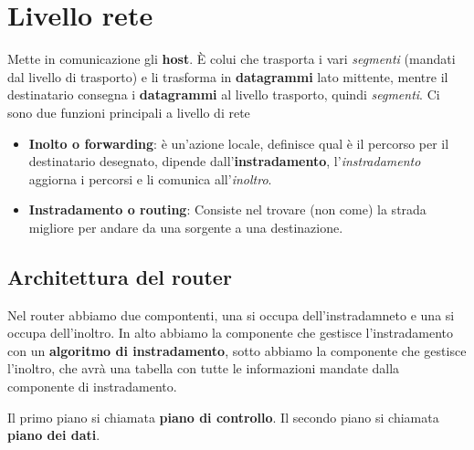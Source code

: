 \section{Livello rete}
Mette in comunicazione gli \textbf{host}. È colui che trasporta i vari \textit{segmenti} (mandati dal livello di trasporto) e li trasforma in \textbf{datagrammi} lato mittente, mentre il destinatario consegna i \textbf{datagrammi} al livello trasporto, quindi \textit{segmenti}.
Ci sono due funzioni principali a livello di rete 
\begin{itemize}
  \item \textbf{Inolto o forwarding}: è un'azione locale, definisce qual è il percorso per il destinatario desegnato, dipende dall'\textbf{instradamento}, l'\textit{instradamento} aggiorna i percorsi e li comunica all'\textit{inoltro}.
  \item \textbf{Instradamento o routing}: Consiste nel trovare (non come) la strada migliore per andare da una sorgente a una destinazione.
\end{itemize}

\subsection{Architettura del router}
Nel router abbiamo due compontenti, una si occupa dell'instradamneto e una si occupa dell'inoltro. 
In alto abbiamo la componente che gestisce l'instradamento con un \textbf{algoritmo di instradamento}, sotto abbiamo la componente che gestisce l'inoltro, che avrà una tabella con tutte le informazioni mandate dalla componente di instradamento. 

Il primo piano si chiamata \textbf{piano di controllo}. 
Il secondo piano si chiamata \textbf{piano dei dati}. 
